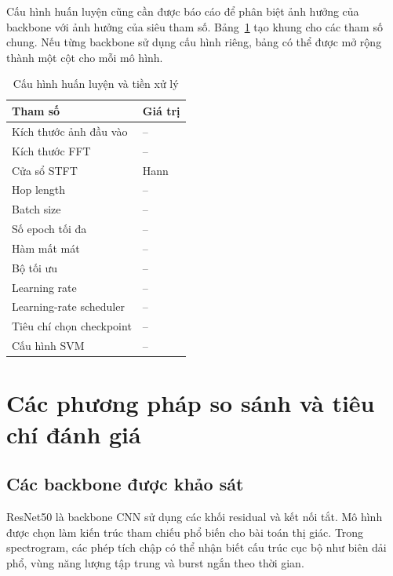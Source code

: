 \documentclass[../DoAn.tex]{subfiles}
\begin{document}
Cấu hình huấn luyện cũng cần được báo cáo để phân biệt ảnh hưởng của backbone với ảnh hưởng của siêu tham số. Bảng~\ref{tab:training_configuration} tạo khung cho các tham số chung. Nếu từng backbone sử dụng cấu hình riêng, bảng có thể được mở rộng thành một cột cho mỗi mô hình.

\begin{table}[H]
    \centering
    \caption{Cấu hình huấn luyện và tiền xử lý}
    \label{tab:training_configuration}
    \renewcommand{\arraystretch}{1.3}
    \begin{tabular}{|p{}|p{}|}
        \hline
        \textbf{Tham số} & \textbf{Giá trị} \\ \hline
        Kích thước ảnh đầu vào & -- \\ \hline
        Kích thước FFT & -- \\ \hline
        Cửa sổ STFT & Hann \\ \hline
        Hop length & -- \\ \hline
        Batch size & -- \\ \hline
        Số epoch tối đa & -- \\ \hline
        Hàm mất mát & -- \\ \hline
        Bộ tối ưu & -- \\ \hline
        Learning rate & -- \\ \hline
        Learning-rate scheduler & -- \\ \hline
        Tiêu chí chọn checkpoint & -- \\ \hline
        Cấu hình SVM & -- \\ \hline
    \end{tabular}
\end{table}

\section{Các phương pháp so sánh và tiêu chí đánh giá}

\subsection{Các backbone được khảo sát}

ResNet50 là backbone CNN sử dụng các khối residual và kết nối tắt. Mô hình được chọn làm kiến trúc tham chiếu phổ biến cho bài toán thị giác. Trong spectrogram, các phép tích chập có thể nhận biết cấu trúc cục bộ như biên dải phổ, vùng năng lượng tập trung và burst ngắn theo thời gian.
\end{document}
